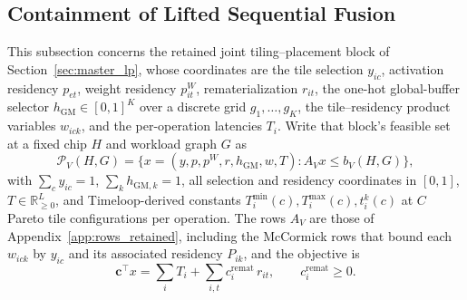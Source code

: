 \subsection{Containment of Lifted Sequential Fusion}
\label{app:fast_containment}
This subsection concerns the retained joint tiling--placement block of Section~\ref{sec:master_lp}, whose coordinates are the tile selection $y_{ic}$, activation residency $p_{et}$, weight residency $p^W_{it}$, rematerialization $r_{it}$, the one-hot global-buffer selector $h_{\mathrm{GM}}\in[0,1]^K$ over a discrete grid $g_1,\ldots,g_K$, the tile--residency product variables $w_{ick}$, and the per-operation latencies $T_i$.
Write that block's feasible set at a fixed chip $H$ and workload graph $G$ as
\begin{equation}
\mathcal P_V(H,G)=\{x=(y,p,p^W,r,h_{\mathrm{GM}},w,T):A_Vx\le b_V(H,G)\},
\label{eq:pv}
\end{equation}
with $\sum_cy_{ic}=1$, $\sum_kh_{\mathrm{GM},k}=1$, all selection and residency coordinates in $[0,1]$, $T\in\mathbb R^L_{\ge0}$, and Timeloop-derived constants $T^{\min}_i(c),T^{\max}_i(c),t^k_i(c)$ at $C$ Pareto tile configurations per operation.
The rows $A_V$ are those of Appendix~\ref{app:rows_retained}, including the McCormick rows that bound each $w_{ick}$ by $y_{ic}$ and its associated residency $P_{ik}$, and the objective is
\begin{equation}
\mathbf c^\top x=\sum_iT_i+\sum_{i,t}c^{\mathrm{remat}}_i\,r_{it},\qquad c^{\mathrm{remat}}_i\ge0.
\label{eq:pv_objective}
\end{equation}

